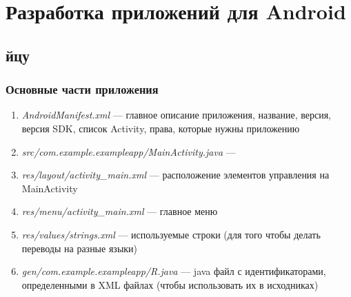 \section{Разработка приложений для Android}
\subsection{йцу}


\begin{frame}[fragile]
	\frametitle{Основные части приложения}

	\begin{enumerate}
	\item{\emph{AndroidManifest.xml} --- главное описание приложения, название, версия, версия SDK, список Activity, права, которые нужны приложению}
	\item{\emph{src/com.example.exampleapp/MainActivity.java} --- }
	\item{\emph{res/layout/activity\_main.xml} --- расположение элементов управления на MainActivity}
	\item{\emph{res/menu/activity\_main.xml} --- главное меню}
	\item{\emph{res/values/strings.xml} --- используемые строки (для того чтобы делать переводы на разные языки)}
	\item{\emph{gen/com.example.exampleapp/R.java} --- java файл с идентификаторами, определенными в XML файлах (чтобы использовать их в исходниках)}
	\end{enumerate}
\end{frame}

